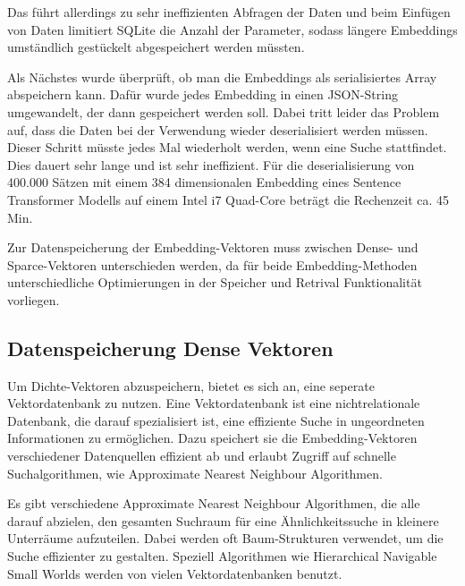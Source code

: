 Das führt allerdings zu sehr ineffizienten Abfragen der Daten und beim Einfügen von Daten limitiert SQLite die Anzahl der Parameter, sodass längere Embeddings umständlich gestückelt abgespeichert werden müssten.

Als Nächstes wurde überprüft, ob man die Embeddings als serialisiertes Array abspeichern kann.
Dafür wurde jedes Embedding in einen JSON-String umgewandelt, der dann gespeichert werden soll. 
Dabei tritt leider das Problem auf, dass die Daten bei der Verwendung wieder deserialisiert werden müssen.
Dieser Schritt müsste jedes Mal wiederholt werden, wenn eine Suche stattfindet. 
Dies dauert sehr lange und ist sehr ineffizient. 
Für die deserialisierung von 400.000 Sätzen mit einem 384 dimensionalen Embedding eines Sentence Transformer Modells auf einem Intel i7 Quad-Core beträgt die Rechenzeit ca. 45 Min.

Zur Datenspeicherung der Embedding-Vektoren muss zwischen Dense- und Sparce-Vektoren unterschieden werden, da für beide Embedding-Methoden unterschiedliche Optimierungen in der Speicher und Retrival Funktionalität vorliegen. 

\subsection{Datenspeicherung Dense Vektoren}

Um Dichte-Vektoren abzuspeichern, bietet es sich an, eine seperate Vektordatenbank zu nutzen.
Eine Vektordatenbank ist eine nichtrelationale Datenbank, die darauf spezialisiert ist, eine effiziente Suche in ungeordneten Informationen zu ermöglichen.
Dazu speichert sie die Embedding-Vektoren verschiedener Datenquellen effizient ab und erlaubt Zugriff auf schnelle Suchalgorithmen, wie Approximate Nearest Neighbour Algorithmen.

Es gibt verschiedene Approximate Nearest Neighbour Algorithmen, die alle darauf abzielen, den gesamten Suchraum für eine Ähnlichkeitssuche in kleinere Unterräume aufzuteilen.
Dabei werden oft Baum-Strukturen verwendet, um die Suche effizienter zu gestalten.
Speziell Algorithmen wie Hierarchical Navigable Small Worlds werden von vielen Vektordatenbanken benutzt.


